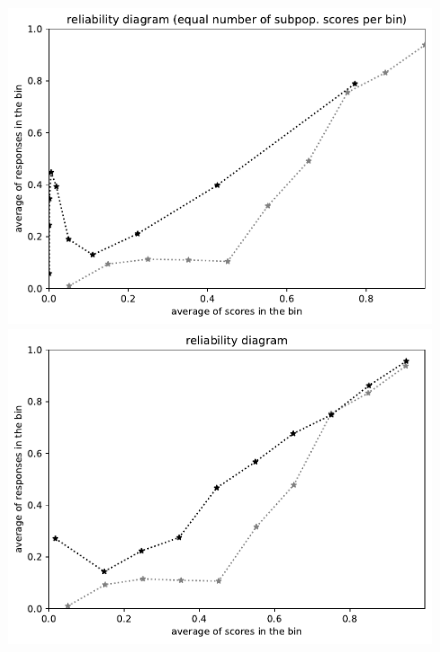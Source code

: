 \documentclass{article}
\newlength{\vertsep}
\newlength{\imsize}
\begin{document}
\begin{figure}
\begin{centering}
\vspace{\vertsep}

\parbox{\imsize}{\includegraphics[width=\imsize]
{../codes/unweighted/10000_7000_10_1/equisamps.pdf}}
\quad\quad
\parbox{\imsize}{\includegraphics[width=\imsize]
{../codes/unweighted/10000_7000_10_1/equiscore.pdf}}

\vspace{\vertsep}


\end{centering}
\end{figure}
\end{document}
